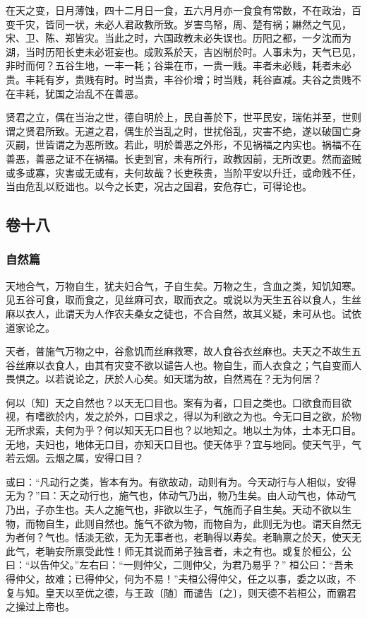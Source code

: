 \documentclass[]{article}
\begin{document}
在天之变，日月薄蚀，四十二月日一食，五六月月亦一食食有常数，不在政治，百变千灾，皆同一状，未必人君政教所致。岁害鸟帑，周、楚有祸；綝然之气见，宋、卫、陈、郑皆灾。当此之时，六国政教未必失误也。历阳之都，一夕沈而为湖，当时历阳长吏未必诳妄也。成败系於天，吉凶制於时。人事未为，天气已见，非时而何？五谷生地，一丰一耗；谷粜在市，一贵一贱。丰者未必贱，耗者未必贵。丰耗有岁，贵贱有时。时当贵，丰谷价增；时当贱，耗谷直减。夫谷之贵贱不在丰耗，犹国之治乱不在善恶。

贤君之立，偶在当治之世，德自明於上，民自善於下，世平民安，瑞佑并至，世则谓之贤君所致。无道之君，偶生於当乱之时，世扰俗乱，灾害不绝，遂以破国亡身灭嗣，世皆谓之为恶所致。若此，明於善恶之外形，不见祸福之内实也。祸福不在善恶，善恶之证不在祸福。长吏到官，未有所行，政教因前，无所改更。然而盗贼或多或寡，灾害或无或有，夫何故哉？长吏秩贵，当阶平安以升迁，或命贱不任，当由危乱以贬诎也。以今之长吏，况古之国君，安危存亡，可得论也。

\hypertarget{header-n761}{%
\subsection{卷十八}\label{header-n761}}

\hypertarget{header-n762}{%
\subsubsection{自然篇}\label{header-n762}}

天地合气，万物自生，犹夫妇合气，子自生矣。万物之生，含血之类，知饥知寒。见五谷可食，取而食之，见丝麻可衣，取而衣之。或说以为天生五谷以食人，生丝麻以衣人，此谓天为人作农夫桑女之徒也，不合自然，故其义疑，未可从也。试依道家论之。

天者，普施气万物之中，谷愈饥而丝麻救寒，故人食谷衣丝麻也。夫天之不故生五谷丝麻以衣食人，由其有灾变不欲以谴告人也。物自生，而人衣食之；气自变而人畏惧之。以若说论之，厌於人心矣。如天瑞为故，自然焉在？无为何居？

何以〔知〕天之自然也？以天无口目也。案有为者，口目之类也。口欲食而目欲视，有嗜欲於内，发之於外，口目求之，得以为利欲之为也。今无口目之欲，於物无所求索，夫何为乎？何以知天无口目也？以地知之。地以土为体，土本无口目。无地，夫妇也，地体无口目，亦知天口目也。使天体乎？宜与地同。使天气乎，气若云烟。云烟之属，安得口目？

或曰：``凡动行之类，皆本有为。有欲故动，动则有为。今天动行与人相似，安得无为？''曰：天之动行也，施气也，体动气乃出，物乃生矣。由人动气也，体动气乃出，子亦生也。夫人之施气也，非欲以生子，气施而子自生矣。天动不欲以生物，而物自生，此则自然也。施气不欲为物，而物自为，此则无为也。谓天自然无为者何？气也。恬淡无欲，无为无事者也，老聃得以寿矣。老聃禀之於天，使天无此气，老聃安所禀受此性！师无其说而弟子独言者，未之有也。或复於桓公，公曰：``以告仲父。''左右曰：``一则仲父，二则仲父，为君乃易乎？''
桓公曰：``吾未得仲父，故难；已得仲父，何为不易！''夫桓公得仲父，任之以事，委之以政，不复与知。皇天以至优之德，与王政〔随〕而谴告〔之〕，则天德不若桓公，而霸君之操过上帝也。
\end{document}
